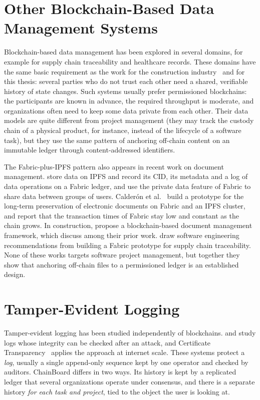 \section{Other Blockchain-Based Data Management Systems}
\label{sec:other-blockchain}

Blockchain-based data management has been explored in several domains, for example for supply chain traceability and healthcare records. These domains have the same basic requirement as the work for the construction industry~\cite{adel2023} and for this thesis: several parties who do not trust each other need a shared, verifiable history of state changes. Such systems usually prefer permissioned blockchains: the participants are known in advance, the required throughput is moderate, and organizations often need to keep some data private from each other. Their data models are quite different from project management (they may track the custody chain of a physical product, for instance, instead of the lifecycle of a software task), but they use the same pattern of anchoring off-chain content on an immutable ledger through content-addressed identifiers.

The Fabric-plus-IPFS pattern also appears in recent work on document management. \textcite{wen2024sharing} store data on IPFS and record its CID, its metadata and a log of data operations on a Fabric ledger, and use the private data feature of Fabric to share data between groups of users. Calderón et al.~\cite{calderon2026gestion} build a prototype for the long-term preservation of electronic documents on Fabric and an IPFS cluster, and report that the transaction times of Fabric stay low and constant as the chain grows. In construction, \textcite{das2022document} propose a blockchain-based document management framework, which \textcite{adel2023} discuss among their prior work. \textcite{hushare2025practices} draw software engineering recommendations from building a Fabric prototype for supply chain traceability. None of these works targets software project management, but together they show that anchoring off-chain files to a permissioned ledger is an established design.

\section{Tamper-Evident Logging}
\label{sec:related-logging}

Tamper-evident logging has been studied independently of blockchains. \textcite{schneier1999secure} and \textcite{crosby2009tamper} study logs whose integrity can be checked after an attack, and Certificate Transparency~\cite{rfc6962} applies the approach at internet scale. These systems protect a \emph{log}, usually a single append-only sequence kept by one operator and checked by auditors. ChainBoard differs in two ways. Its history is kept by a replicated ledger that several organizations operate under consensus, and there is a separate history \emph{for each task and project}, tied to the object the user is looking at.

